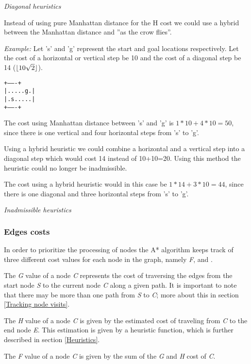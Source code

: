 \documentclass[12pt, a4paper]{article}
\DeclarePairedDelimiter{\floor}{\lfloor}{\rfloor}
\begin{document}
\textit{Diagonal heuristics}

Instead of using pure Manhattan distance for the H cost we could use a hybrid
between the Manhattan distance and ''as the crow flies''.

\textit{Example:} Let 's' and 'g' represent the start and goal locations
respectively. Let the cost of a horizontal or vertical step be 10 and the cost
of a diagonal step be 14 ($ \floor{10 \sqrt{2}} $).

\texttt{+-------+ \\
|.....g.| \\
|.s.....| \\
+-------+}

The cost using Manhattan distance between 's' and 'g' is $ 1*10 + 4*10 = 50 $,
since there is one vertical and four horizontal steps from 's' to 'g'.

Using a hybrid heuristic we could combine a horizontal and a vertical step into
a diagonal step which would cost 14 instead of 10+10=20. Using this method the
heuristic could no longer be inadmissible.

The cost using a hybrid heuristic would in this case be $ 1*14 + 3*10 = 44 $,
since there is one diagonal and three horizontal steps from 's' to 'g'.

\textit{Inadmissible heuristics}


\subsubsection{Edges costs}

In order to prioritize the processing of nodes the A* algorithm keeps track of
three different cost values for each node in the graph, namely \textit{F},
 and .

The \textit{G} value of a node \textit{C} represents the cost of traversing the
edges from the start node \textit{S} to the current node \textit{C} along a
given path. It is important to note that there may be more than one path from
\textit{S} to \textit{C}; more about this in section \ref{Tracking node visits}.

The \textit{H} value of a node \textit{C} is given by the estimated cost of
traveling from \textit{C} to the end node \textit{E}. This estimation is given
by a heuristic function, which is further described in section \ref{Heuristics}.

The \textit{F} value of a node \textit{C} is given by the sum of the \textit{G}
and \textit{H} cost of \textit{C}.
\end{document}
